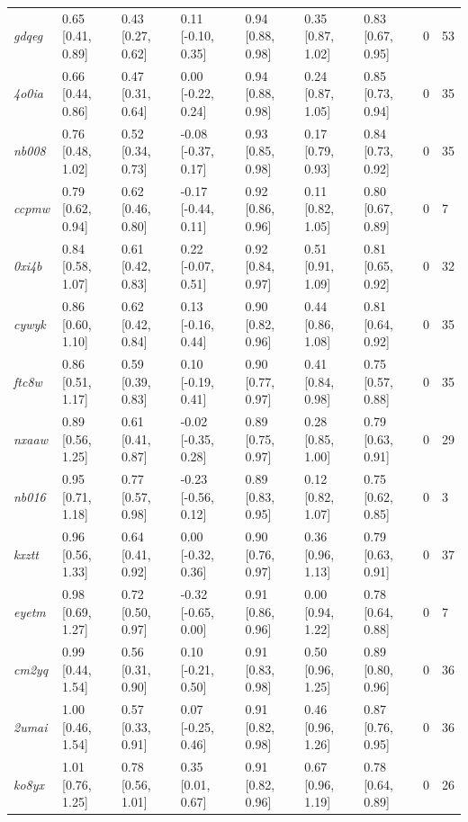 \documentclass[9pt,lineno,final]{elife}
\begin{document}
\begin{table}[tb!]
\begin{center}
\begin{threeparttable}
\begin{tabular}{@{}lllllllll@{}}
\textit{gdqeg} & 0.65 [0.41, 0.89] & 0.43 [0.27, 0.62] & 0.11 [-0.10, 0.35] & 0.94 [0.88, 0.98] & 0.35 [0.87, 1.02] & 0.83 [0.67, 0.95] & 0 & 53 \\
\textit{4o0ia} & 0.66 [0.44, 0.86] & 0.47 [0.31, 0.64] & 0.00 [-0.22, 0.24] & 0.94 [0.88, 0.98] & 0.24 [0.87, 1.05] & 0.85 [0.73, 0.94] & 0 & 35 \\
\textit{nb008} & 0.76 [0.48, 1.02] & 0.52 [0.34, 0.73] & -0.08 [-0.37, 0.17] & 0.93 [0.85, 0.98] & 0.17 [0.79, 0.93] & 0.84 [0.73, 0.92] & 0 & 35 \\
\textit{ccpmw} & 0.79 [0.62, 0.94] & 0.62 [0.46, 0.80] & -0.17 [-0.44, 0.11] & 0.92 [0.86, 0.96] & 0.11 [0.82, 1.05] & 0.80 [0.67, 0.89] & 0 & 7 \\
\textit{0xi4b} & 0.84 [0.58, 1.07] & 0.61 [0.42, 0.83] & 0.22 [-0.07, 0.51] & 0.92 [0.84, 0.97] & 0.51 [0.91, 1.09] & 0.81 [0.65, 0.92] & 0 & 32 \\
\textit{cywyk} & 0.86 [0.60, 1.10] & 0.62 [0.42, 0.84] & 0.13 [-0.16, 0.44] & 0.90 [0.82, 0.96] & 0.44 [0.86, 1.08] & 0.81 [0.64, 0.92] & 0 & 35 \\
\textit{ftc8w} & 0.86 [0.51, 1.17] & 0.59 [0.39, 0.83] & 0.10 [-0.19, 0.41] & 0.90 [0.77, 0.97] & 0.41 [0.84, 0.98] & 0.75 [0.57, 0.88] & 0 & 35 \\
\textit{nxaaw} & 0.89 [0.56, 1.25] & 0.61 [0.41, 0.87] & -0.02 [-0.35, 0.28] & 0.89 [0.75, 0.97] & 0.28 [0.85, 1.00] & 0.79 [0.63, 0.91] & 0 & 29 \\
\textit{nb016} & 0.95 [0.71, 1.18] & 0.77 [0.57, 0.98] & -0.23 [-0.56, 0.12] & 0.89 [0.83, 0.95] & 0.12 [0.82, 1.07] & 0.75 [0.62, 0.85] & 0 & 3 \\
\textit{kxztt} & 0.96 [0.56, 1.33] & 0.64 [0.41, 0.92] & 0.00 [-0.32, 0.36] & 0.90 [0.76, 0.97] & 0.36 [0.96, 1.13] & 0.79 [0.63, 0.91] & 0 & 37 \\
\textit{eyetm} & 0.98 [0.69, 1.27] & 0.72 [0.50, 0.97] & -0.32 [-0.65, 0.00] & 0.91 [0.86, 0.96] & 0.00 [0.94, 1.22] & 0.78 [0.64, 0.88] & 0 & 7 \\
\textit{cm2yq} & 0.99 [0.44, 1.54] & 0.56 [0.31, 0.90] & 0.10 [-0.21, 0.50] & 0.91 [0.83, 0.98] & 0.50 [0.96, 1.25] & 0.89 [0.80, 0.96] & 0 & 36 \\
\textit{2umai} & 1.00 [0.46, 1.54] & 0.57 [0.33, 0.91] & 0.07 [-0.25, 0.46] & 0.91 [0.82, 0.98] & 0.46 [0.96, 1.26] & 0.87 [0.76, 0.95] & 0 & 36 \\
\textit{ko8yx} & 1.01 [0.76, 1.25] & 0.78 [0.56, 1.01] & 0.35 [0.01, 0.67] & 0.91 [0.82, 0.96] & 0.67 [0.96, 1.19] & 0.78 [0.64, 0.89] & 0 & 26 \\

\end{tabular}
\end{threeparttable}
\end{center}
\end{table}
\end{document}
